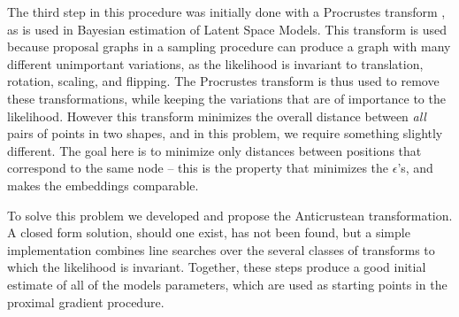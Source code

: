 \documentclass{article}
\begin{document}
The third step in this procedure was initially done with a Procrustes transform \cite{hoff-2002}, as is used in Bayesian estimation of Latent Space Models. This transform is used because proposal graphs in a sampling procedure can produce a graph with many different unimportant variations, as the likelihood is invariant to translation, rotation, scaling, and flipping. The Procrustes transform is thus used to remove these transformations, while keeping the variations that are of importance to the likelihood. However this transform minimizes the overall distance between \textit{all} pairs of points in two shapes, and in this problem, we require something slightly different. The goal here is to minimize only distances between positions that correspond to the same node -- this is the property that minimizes the $\epsilon$'s, and makes the embeddings comparable.

To solve this problem we developed and propose the Anticrustean transformation. A closed form solution, should one exist, has not been found, but a simple implementation combines line searches over the several classes of transforms to which the likelihood is invariant. Together, these steps produce a good initial estimate of all of the models parameters, which are used as starting points in the proximal gradient procedure. 

\end{document}
